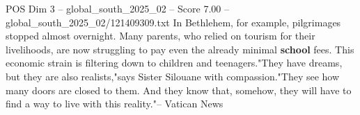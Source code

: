 \begin{textsample}{POS Dim 3 – global\_south\_2025\_02 – Score 7.00 – global\_south\_2025\_02/121409309.txt}
In Bethlehem, for example, pilgrimages stopped almost overnight.
Many parents, who relied on tourism for their livelihoods, are now struggling to pay even the already minimal \textbf{school} fees.
This economic strain is filtering down to children and teenagers."They have dreams, but they are also realists,"says Sister Silouane with compassion."They see how many doors are closed to them.
And they know that, somehow, they will have to find a way to live with this reality."-- Vatican News

\end{textsample}
